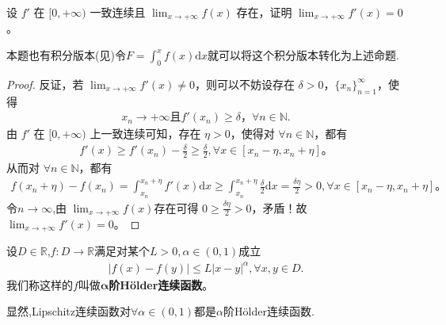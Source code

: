 \documentclass[../../main.tex]{subfiles}%
\begin{document}
\begin{proposition}\label{proposition:经典导数一致连续问题}
设 $f'$ 在 $[0,+\infty)$ 一致连续且 $\lim_{x \to +\infty} f(x)$ 存在，证明 $\lim_{x \to +\infty} f'(x) = 0$。
\end{proposition}
\begin{remark}
本题也有积分版本(见)令$F=\int_0^x{f\left( x \right) \mathrm{d}x}$就可以将这个积分版本转化为上述命题.
\end{remark}
\begin{proof}
反证，若 $\lim_{x\rightarrow +\infty} f'(x) \ne 0$，则可以不妨设存在 $\delta >0$，$\{ x_n \}_{n=1}^{\infty}$，使得
\begin{align*}
x_n\rightarrow +\infty \text{且} f'(x_n) \geqslant \delta，\forall n\in \mathbb{N}.    
\end{align*}
由 $f'$ 在 $[0,+\infty)$ 上一致连续可知，存在 $\eta >0$，使得对 $\forall n\in \mathbb{N}$，都有
\begin{align*}
f'(x) \geqslant f'(x_n) -\frac{\delta}{2} \geqslant \frac{\delta}{2}, \forall x\in [x_n-\eta ,x_n+\eta] 。
\end{align*}
从而对 $\forall n\in \mathbb{N}$，都有
\begin{align*}
f(x_n+\eta) -f(x_n) =\int_{x_n}^{x_n+\eta} f'(x) \mathrm{d}x \geqslant \int_{x_n}^{x_n+\eta} \frac{\delta}{2} \mathrm{d}x = \frac{\delta \eta}{2} > 0, \forall x\in [x_n-\eta ,x_n+\eta] 。
\end{align*}
令$n\rightarrow \infty$,由 $\lim_{x\rightarrow +\infty} f(x) $存在可得 $0 \geqslant \frac{\delta \eta}{2} > 0$，矛盾！故 $\lim_{x\rightarrow +\infty} f'(x) =0$。
\end{proof}

\begin{definition}[Hölder连续]
设$D\in \mathbb{R}$,$f\colon D\to \mathbb{R}$满足对某个$L>0,\alpha\in(0,1)$成立
\begin{align*}
|f(x)-f(y)|\leqslant L|x-y|^\alpha,\forall x,y\in D.
\end{align*}
我们称这样的$f$叫做$\boldsymbol{\alpha}$\textbf{阶Hölder连续函数}。
\end{definition}
\begin{remark}
显然,Lipschitz连续函数对$\forall \alpha \in (0,1)$都是$\alpha$阶Hölder连续函数.
\end{remark}
\end{document}

